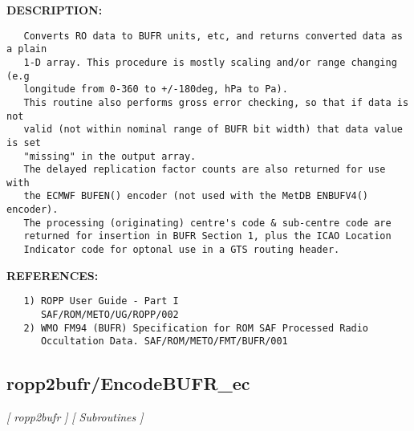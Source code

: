 \textbf{DESCRIPTION:}\hspace{0.08in}\begin{Verbatim}
   Converts RO data to BUFR units, etc, and returns converted data as a plain
   1-D array. This procedure is mostly scaling and/or range changing (e.g
   longitude from 0-360 to +/-180deg, hPa to Pa).
   This routine also performs gross error checking, so that if data is not
   valid (not within nominal range of BUFR bit width) that data value is set
   "missing" in the output array.
   The delayed replication factor counts are also returned for use with
   the ECMWF BUFEN() encoder (not used with the MetDB ENBUFV4() encoder).
   The processing (originating) centre's code & sub-centre code are
   returned for insertion in BUFR Section 1, plus the ICAO Location
   Indicator code for optonal use in a GTS routing header.
\end{Verbatim}
\textbf{REFERENCES:}\hspace{0.08in}\begin{Verbatim}
   1) ROPP User Guide - Part I
      SAF/ROM/METO/UG/ROPP/002
   2) WMO FM94 (BUFR) Specification for ROM SAF Processed Radio
      Occultation Data. SAF/ROM/METO/FMT/BUFR/001
\end{Verbatim}
\subsection{ropp2bufr/EncodeBUFR\_ec}
\textsl{[ ropp2bufr ]}
\textsl{[ Subroutines ]}

